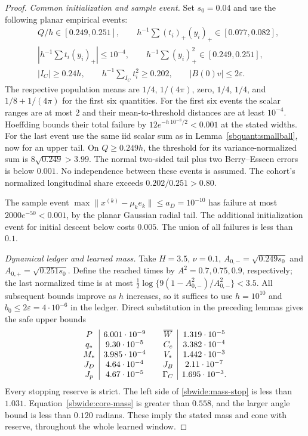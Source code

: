 \documentclass{article} %
\theoremstyle{plain}
\theoremstyle{definition}
\theoremstyle{remark}
\begin{document}
\begin{proof}
\emph{Common initialization and sample event.}
Set $s_0=0.04$ and use the following planar empirical events:
\begin{align*}
 &Q/h\in[0.249,0.251],\qquad
 h^{-1}\sum(t_i)_+(y_i)_+\in[0.077,0.082],\\
 &\left|h^{-1}\sum t_i(y_i)_+\right|\le10^{-4},\qquad
 h^{-1}\sum(y_i)_+^2\in[0.249,0.251],\\
 &|I_C|\ge0.24h,\qquad h^{-1}\sum_{I_C}t_i^2\ge0.202,
 \qquad |B(0)v|\le2\varepsilon.
\end{align*}
The respective population means are $1/4$, $1/(4\pi)$, zero, $1/4$,
$1/4$, and $1/8+1/(4\pi)$ for the first six quantities.
For the first six events the scalar ranges are at most $2$ and their
mean-to-threshold distances are at least $10^{-4}$. Hoeffding bounds
their total failure by $12e^{-h\,10^{-8}/2}<0.001$ at the stated
widths. For the last event use the same iid scalar sum as in
Lemma~\ref{sbquant:smallball}, now for an upper tail. On $Q\ge0.249h$,
the threshold for its variance-normalized sum is
$8\sqrt{0.249}>3.99$. The normal two-sided tail plus two
Berry--Esseen errors is below $0.001$. No independence between these
events is assumed. The cohort's normalized longitudinal share exceeds
$0.202/0.251>0.80$.

The sample event $\max\|x^{(k)}-\mu_ke_k\|\le a_D=10^{-10}$ has failure
at most $2000e^{-50}<0.001$, by the planar Gaussian radial tail.
The additional initialization event for initial descent below costs
$0.005$. The union of all failures is less than $0.1$.

\emph{Dynamical ledger and learned mass.}
Take $H=3.5$, $\nu=0.1$,
$A_{0,-}=\sqrt{0.249s_0}$ and $A_{0,+}=\sqrt{0.251s_0}$.
Define the reached times by $A^2=0.7,0.75,0.9$, respectively;
the last normalized time is at most
$\frac12\log\{9(1-A_{0,-}^2)/A_{0,-}^2\}<3.5$.
All subsequent bounds improve as $h$ increases, so it suffices to use
$h=10^{10}$ and $b_0\le2\varepsilon=4\cdot10^{-6}$ in the ledger.
Direct substitution in the preceding lemmas gives the safe upper bounds
\[
\begin{array}{c|c@{\qquad}c|c}
 P&6.001\cdot10^{-9}&\overline W&1.319\cdot10^{-5}\\
 q_*&9.30\cdot10^{-5}&C_c&3.382\cdot10^{-4}\\
 M_*&3.985\cdot10^{-4}&V_*&1.442\cdot10^{-3}\\
 J_D&4.64\cdot10^{-4}&J_B&2.11\cdot10^{-7}\\
 J_p&4.67\cdot10^{-5}&\Gamma_C&1.695\cdot10^{-3}.
\end{array}
\]
Every stopping reserve is strict. The left side of
\eqref{sbwide:mass-stop} is less than $1.031$.
Equation~\eqref{sbwide:core-mass} is greater than $0.558$, and the
larger angle bound is less than $0.120$ radians. These imply the stated
mass and cone with reserve, throughout the whole learned window.


\end{proof}
\end{document}
